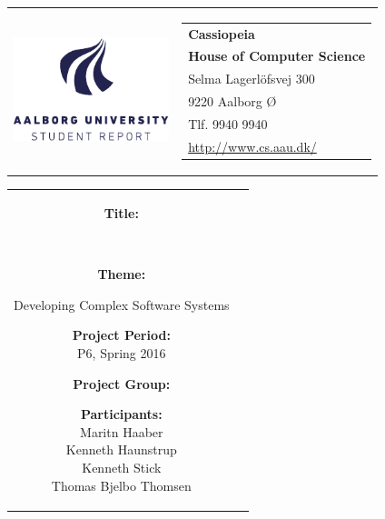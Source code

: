 \begin{titlepage}
    \setlength{\textwidth}{15cm}
	\noindent
	\begin{nopagebreak}
	{\samepage 
			\begin{tabular}{lr}
				\parbox{0.5\textwidth}{\raisebox{11mm}
					{\includegraphics[height=3.0cm]{Images/aauLogo.pdf}}
				} &
				\parbox{0.5\textwidth}{
					\small
					\begin{tabular}{l}
						{\sf\small \textbf{Cassiopeia}}\\
						{\sf\small \textbf{House of Computer Science}} \\
						{\sf\small Selma Lagerlöfsvej 300} \\
						{\sf\small 9220 Aalborg Ø} \\
						{\sf\small Tlf. 9940 9940} \\
						{\sf\small \url{http://www.cs.aau.dk/}}
					\end{tabular}
				}
			\end{tabular}
			
			\noindent
			\begin{tabular}{cc}
				\parbox{7cm}{
					\begin{description}
			
						\item {\bf Title:} 
						
							\textbf{\rapportnavn}\\
			            
			  
						\item {\bf Theme:}
						
							Developing Complex Software Systems
		                \newline
						\item {\bf Project Period:}\\
			  				P6, Spring 2016
			 			\newline
						\item {\bf Project Group:}\\
							\gruppenummer
			  				\hspace{4cm}
			  			\newline
						\item {\bf Participants:}\\
							Maritn Haaber\\
                            Kenneth Haunstrup\\
                            Kenneth Stick\\
                            Thomas Bjelbo Thomsen\\
							\hspace{2cm}
						

\end{description}}
\end{tabular}}
\end{nopagebreak}
\end{titlepage}
